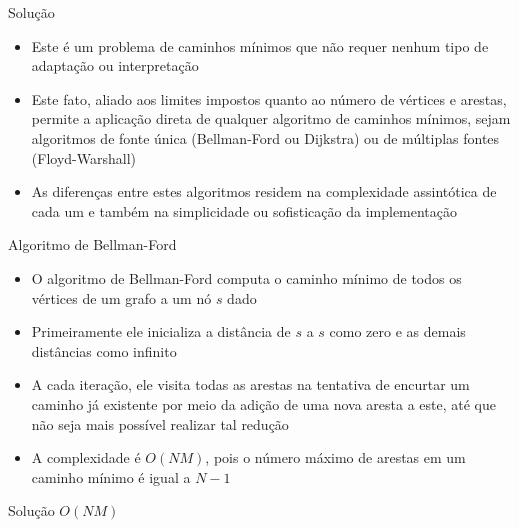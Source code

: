 \begin{frame}[fragile]{Solução}

    \begin{itemize}
        \item Este é um problema de caminhos mínimos que não requer nenhum tipo de adaptação
            ou interpretação

        \item Este fato, aliado aos limites impostos quanto ao número de vértices e arestas,
            permite a aplicação direta de qualquer algoritmo de caminhos mínimos, sejam algoritmos
            de fonte única (Bellman-Ford ou Dijkstra) ou de múltiplas fontes (Floyd-Warshall)

        \item As diferenças entre estes algoritmos residem na complexidade assintótica de cada um
            e também na simplicidade ou sofisticação da implementação
    \end{itemize}

\end{frame}

\begin{frame}[fragile]{Algoritmo de Bellman-Ford}

    \begin{itemize}
        \item O algoritmo de Bellman-Ford computa o caminho mínimo de todos os vértices de
            um grafo a um nó $s$ dado

        \item Primeiramente ele inicializa a distância de $s$ a $s$ como zero e as demais 
            distâncias como infinito 

        \item A cada iteração, ele visita todas as arestas na tentativa de encurtar um
            caminho já existente por meio da adição de uma nova aresta a este, até que não seja
            mais possível realizar tal redução

        \item A complexidade é $O(NM)$, pois o número máximo de arestas em um caminho mínimo é
            igual a $N - 1$
    \end{itemize}

\end{frame}



\begin{frame}[fragile]{Solução $O(NM)$}
\end{frame}

